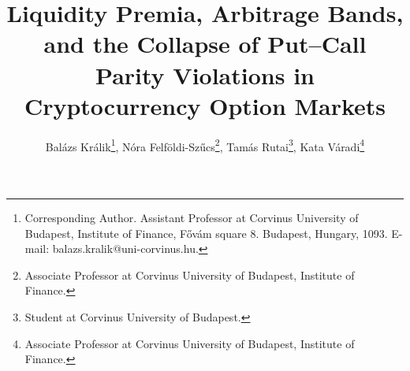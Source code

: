 \documentclass[12pt]{article}
\begin{document}
\title{\textbf{Liquidity Premia, Arbitrage Bands, and the Collapse of Put--Call Parity Violations in Cryptocurrency Option Markets}}

\author{Balázs Králik\thanks{Corresponding Author. Assistant Professor at Corvinus University of Budapest, Institute of Finance, Fővám square 8. Budapest, Hungary, 1093. E-mail: balazs.kralik@uni-corvinus.hu.}, Nóra Felföldi-Szűcs\thanks{Associate Professor at Corvinus University of Budapest, Institute of Finance.}, Tamás Rutai\thanks{Student at Corvinus University of Budapest.}, Kata Váradi\thanks{Associate Professor at Corvinus University of Budapest, Institute of Finance.}}
\date{}

\maketitle
\end{document}
